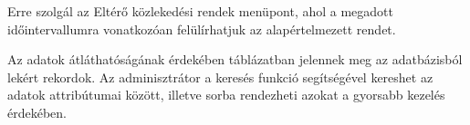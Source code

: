 Erre szolgál az Eltérő közlekedési rendek menüpont, ahol a megadott időintervallumra vonatkozóan felülírhatjuk az alapértelmezett rendet.

Az adatok átláthatóságának érdekében táblázatban jelennek meg az adatbázisból lekért rekordok.
Az adminisztrátor a keresés funkció segítségével kereshet az adatok attribútumai között, illetve sorba rendezheti azokat a gyorsabb kezelés érdekében.




















